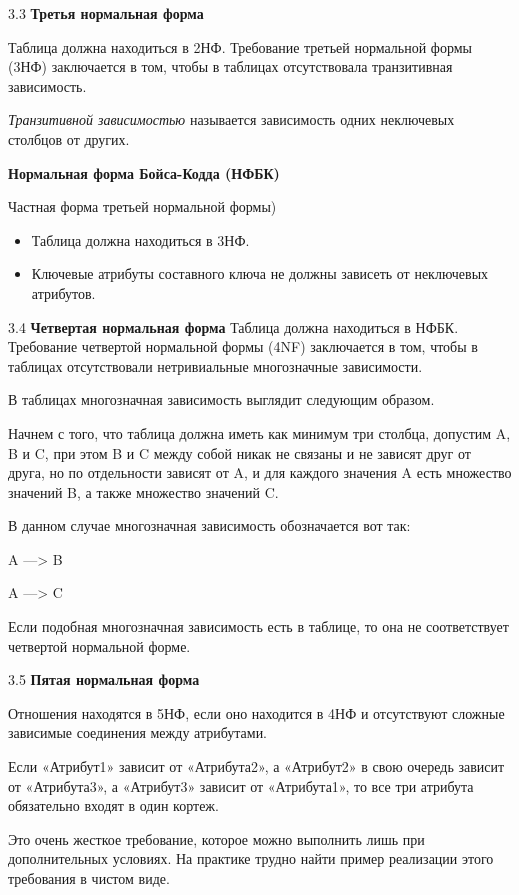 3.3 \textbf{Третья нормальная форма}

Таблица должна находиться в 2НФ. Требование третьей нормальной формы (3НФ) заключается в том, чтобы в таблицах отсутствовала транзитивная зависимость.

\textit{Транзитивной зависимостью} называется зависимость одних неключевых столбцов от других.

\textbf{Нормальная форма Бойса-Кодда (НФБК)} 

Частная форма третьей нормальной формы)

\begin{itemize}
	\item Таблица должна находиться в 3НФ. 
	\item Ключевые атрибуты составного ключа не должны зависеть от неключевых атрибутов.
\end{itemize}
 

3.4 \textbf{Четвертая нормальная форма}
Таблица должна находиться в НФБК.
Требование четвертой нормальной формы (4NF) заключается в том, чтобы в таблицах отсутствовали нетривиальные многозначные зависимости.

В таблицах многозначная зависимость выглядит следующим образом.

Начнем с того, что таблица должна иметь как минимум три столбца, допустим A, B и C, при этом B и C между собой никак не связаны и не зависят друг от друга, но по отдельности зависят от A, и для каждого значения A есть множество значений B, а также множество значений C.

В данном случае многозначная зависимость обозначается вот так:

A —> B

A —> C

Если подобная многозначная зависимость есть в таблице, то она не соответствует четвертой нормальной форме.

3.5 \textbf{Пятая нормальная форма}

Отношения находятся в 5НФ, если оно находится в 4НФ и отсутствуют сложные зависимые соединения между атрибутами.

Если «Атрибут1» зависит от «Атрибута2», а «Атрибут2» в свою очередь зависит от «Атрибута3», а «Атрибут3» зависит от «Атрибута1», то все три атрибута обязательно входят в один кортеж.

Это очень жесткое требование, которое можно выполнить лишь при дополнительных условиях. На практике трудно найти пример реализации этого требования в чистом виде.

